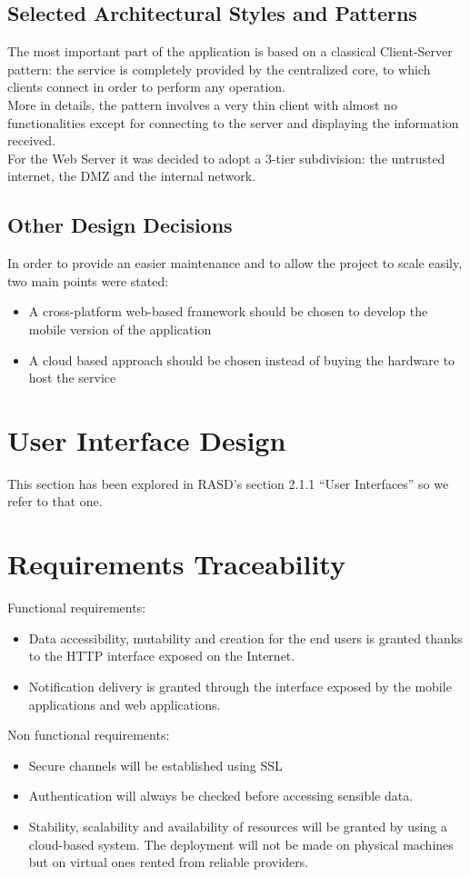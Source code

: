\documentclass{article}
\begin{document}
\subsection{Selected Architectural Styles and Patterns}
The most important part of the application is based on a classical Client-Server pattern: the service is completely provided by the centralized core, to which clients connect in order to perform any operation.\\
More in details, the pattern involves a very thin client with almost no functionalities except for connecting to the server and displaying the information received.\\
For the Web Server it was decided to adopt a 3-tier subdivision: the untrusted internet, the DMZ and the internal network. %
\subsection{Other Design Decisions}
In order to provide an easier maintenance and to allow the project to scale easily, two main points were stated: 
\begin{itemize}
	\item A cross-platform web-based framework should be chosen to develop the mobile version of the application 
	\item A cloud based approach should be chosen instead of buying the hardware to host the service
\end{itemize}

\section{User Interface Design}
This section has been explored in RASD's section 2.1.1 ``User Interfaces'' so we refer to that one.

\section{Requirements Traceability}
Functional requirements:
\begin{itemize}
	\item Data accessibility, mutability and creation for the end users is granted thanks to the HTTP interface exposed on the Internet.
	\item Notification delivery is granted through the interface exposed by the mobile applications and web applications.
\end{itemize}
Non functional requirements:
\begin{itemize}
	\item Secure channels will be established using SSL 
	\item Authentication will always be checked before accessing sensible data.
	\item Stability, scalability and availability of resources will be granted by using a cloud-based system. The deployment will not be made on physical machines but on virtual ones rented from reliable providers.
\end{itemize}
\end{document}
